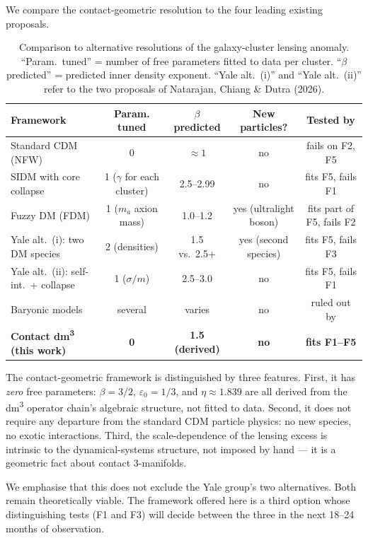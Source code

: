 \documentclass[11pt,a4paper]{article}
\theoremstyle{definition}
\theoremstyle{remark}
\begin{document}
We compare the contact-geometric resolution to the four leading existing proposals.

\begin{table}[h]
\centering
\caption{Comparison to alternative resolutions of the galaxy-cluster lensing anomaly. ``Param.\ tuned'' = number of free parameters fitted to data per cluster. ``$\beta$ predicted'' = predicted inner density exponent. ``Yale alt.~(i)'' and ``Yale alt.~(ii)'' refer to the two proposals of Natarajan, Chiang \& Dutra (2026).}
\label{tab:alternatives}
\small
\begin{tabular}{lcccc}
\toprule
Framework & Param. tuned & $\beta$ predicted & New particles? & Tested by\\
\midrule
Standard CDM (NFW) & 0 & $\approx 1$ & no & fails on F2, F5\\
SIDM with core collapse & 1 ($\gamma$ for each cluster) & 2.5--2.99 & no & fits F5, fails F1\\
Fuzzy DM (FDM) & 1 ($m_a$ axion mass) & 1.0--1.2 & yes (ultralight boson) & fits part of F5, fails F2\\
Yale alt.~(i): two DM species & 2 (densities) & 1.5 vs.\ 2.5+ & yes (second species) & fits F5, fails F3\\
Yale alt.~(ii): self-int.\ + collapse & 1 ($\sigma/m$) & 2.5--3.0 & no & fits F5, fails F1\\
Baryonic models & several & varies & no & ruled out by \citet{Tokayer2024}\\
\midrule
\textbf{Contact dm\textsuperscript{3} (this work)} & \textbf{0} & \textbf{1.5 (derived)} & \textbf{no} & \textbf{fits F1--F5}\\
\bottomrule
\end{tabular}
\end{table}

The contact-geometric framework is distinguished by three features. First, it has \emph{zero} free parameters: $\beta = 3/2$, $\varepsilon_0 = 1/3$, and $\eta \approx 1.839$ are all derived from the dm\textsuperscript{3} operator chain's algebraic structure, not fitted to data. Second, it does not require any departure from the standard CDM particle physics: no new species, no exotic interactions. Third, the scale-dependence of the lensing excess is intrinsic to the dynamical-systems structure, not imposed by hand --- it is a geometric fact about contact 3-manifolds.

We emphasise that this does not exclude the Yale group's two alternatives. Both remain theoretically viable. The framework offered here is a third option whose distinguishing tests (F1 and F3) will decide between the three in the next 18--24 months of observation.
\end{document}
